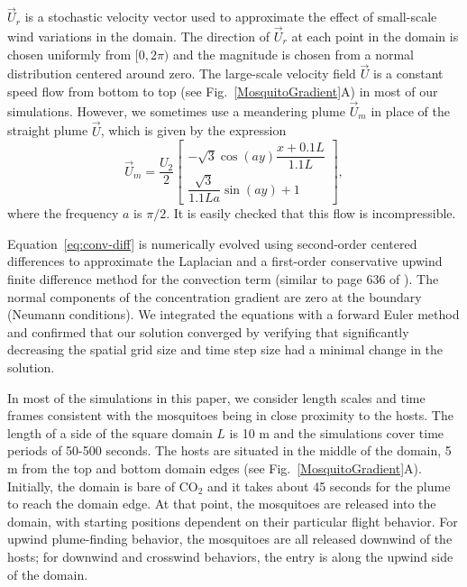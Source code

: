 \documentclass[10pt]{article}
\begin{document}
$\vec{U}_r$ is a stochastic velocity vector used to approximate the effect of small-scale wind variations in the domain. The direction of $\vec{U}_r$ at each point in the domain is chosen uniformly from $[0,2\pi)$ and the magnitude is chosen from a normal distribution centered around zero. 
The large-scale velocity field $\vec{U}$ is a constant speed flow from bottom to top (see Fig.~\ref{MosquitoGradient}A) in most of our simulations. However, we sometimes use a meandering plume $\vec{U}_m$ in place of the straight plume $\vec{U}$, which is given by the expression
\begin{equation}
	\vec{U}_m = \frac{U_2}{2}\begin{bmatrix} -\sqrt{3}\cos(ay)\dfrac{x+0.1L}{1.1L} \label{eqn:meander} \\
	 \dfrac{\sqrt{3}}{1.1L a}\sin(ay)+1\end{bmatrix}, 
\end{equation}
where the frequency $a$ is $\pi/2$. It is easily checked that this flow is incompressible. 

Equation~\eqref{eq:conv-diff} is numerically evolved using second-order centered differences to approximate the Laplacian and  a first-order conservative upwind finite difference method for the convection term (similar to page 636 of \cite{Leveque1996}). The normal components of the concentration gradient are zero at the boundary (Neumann conditions).  We integrated the equations with a forward Euler method and confirmed that our solution converged by verifying that significantly decreasing the spatial grid size and time step size had a minimal change in the solution. 

In most of the simulations in this paper, we consider length scales and time frames consistent with the mosquitoes being in close proximity to the hosts. The length of a side of the square domain $L$ is 10 m and the simulations cover time periods of 50-500 seconds. The hosts are situated in the middle of the domain, 5 m from the top and bottom domain edges (see Fig.~\ref{MosquitoGradient}A). Initially, the domain is bare of CO$_2$ and it takes about 45 seconds for the plume to reach the domain edge. At that point, the mosquitoes are released into the domain, with starting positions dependent on their particular flight behavior. For upwind plume-finding behavior, the mosquitoes are all released downwind of the hosts;  for downwind and crosswind behaviors, the entry is along the upwind side of the domain.

\end{document}

